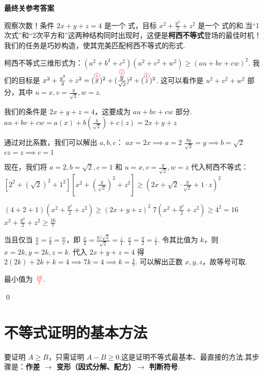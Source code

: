 \begin{solution}
	\textbf{最终关参考答案}
	
	\textcolor{green!50!black}{观察次数！条件 $2x+y+z=4$ 是一个  式，目标 $x^2+\frac{y^2}{2}+z^2$ 是一个  式的和.当“1次式”和“2次平方和”这两种结构同时出现时，这便是\textbf{柯西不等式}登场的最佳时机！我们的任务是巧妙构造，使其完美匹配柯西不等式的形式.}

		柯西不等式三维形式为：$(a^2+b^2+c^2)(u^2+v^2+w^2) \ge (au+bv+cw)^2$.
		我们的目标是 $x^2+\frac{y^2}{2}+z^2 = (\degree{1}{x})^2 + (\frac{\degree{1}{y}}{\sqrt{2}})^2 + (\degree{1}{z})^2$.
		这可以看作是 $u^2+v^2+w^2$ 部分，其中 $u=x, v=\frac{y}{\sqrt{2}}, w=z$.
		
		我们的条件是 $2x+y+z=4$，这要成为 $au+bv+cw$ 部分.
		$au+bv+cw = a(x) + b(\frac{y}{\sqrt{2}}) + c(z) = 2x+y+z$

		通过对比系数，我们可以解出 $a,b,c$：
		$ax = 2x \implies a=2$
		$\frac{by}{\sqrt{2}} = y \implies b=\sqrt{2}$
		$cz=z \implies c=1$

		现在，我们将 $a=2, b=\sqrt{2}, c=1$ 和 $u=x, v=\frac{y}{\sqrt{2}}, w=z$ 代入柯西不等式：
		$\left[ 2^2 + (\sqrt{2})^2 + 1^2 \right] \left[ x^2 + (\frac{y}{\sqrt{2}})^2 + z^2 \right] \ge \left( 2x + \sqrt{2}\cdot\frac{y}{\sqrt{2}} + 1\cdot z \right)^2$

		$(4+2+1) \left( x^2+\frac{y^2}{2}+z^2 \right) \ge (2x+y+z)^2$
		$7 \left( x^2+\frac{y^2}{2}+z^2 \right) \ge 4^2 = 16$
		$x^2+\frac{y^2}{2}+z^2 \ge \frac{16}{7}$

		当且仅当 $\frac{u}{a}=\frac{v}{b}=\frac{w}{c}$，即 $\frac{x}{2} = \frac{y/\sqrt{2}}{\sqrt{2}} = \frac{z}{1}$.
		$\frac{x}{2} = \frac{y}{2} = \frac{z}{1}$.
		令其比值为 $k$，则 $x=2k, y=2k, z=k$.
		代入 $2x+y+z=4$ 得 $2(2k)+2k+k=4 \implies 7k=4 \implies k=\frac{4}{7}$.
		可以解出正数 $x,y,z$，故等号可取.

	最小值为 $\textcolor{red}{\frac{16}{7}}$.
\end{solution}
\qed

\section{不等式证明的基本方法}

\begin{definition}[作差法]
	要证明 $A \ge B$，只需证明 $A-B \ge 0$.这是证明不等式最基本、最直接的方法.其步骤是：\textbf{作差 $\rightarrow$ 变形（因式分解、配方）$\rightarrow$ 判断符号}.
\end{definition}

